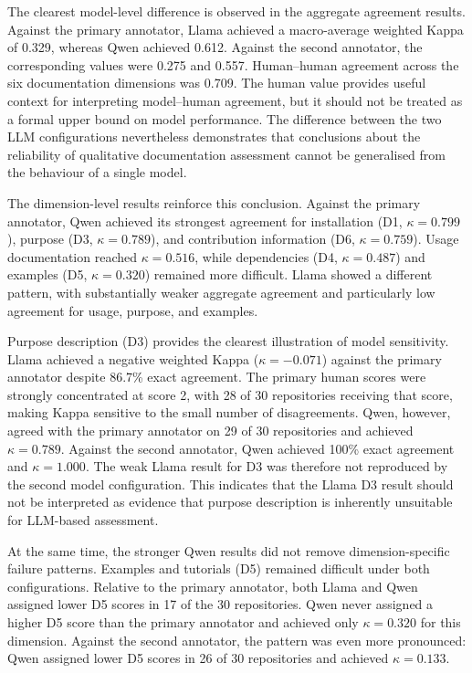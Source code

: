 The clearest model-level difference is observed in the aggregate
agreement results. Against the primary annotator, Llama achieved a
macro-average weighted Kappa of 0.329, whereas Qwen achieved 0.612.
Against the second annotator, the corresponding values were 0.275
and 0.557. Human--human agreement across the six documentation
dimensions was 0.709. The human value provides useful context for
interpreting model--human agreement, but it should not be treated as
a formal upper bound on model performance. The difference between
the two LLM configurations nevertheless demonstrates that conclusions
about the reliability of qualitative documentation assessment cannot
be generalised from the behaviour of a single model.

The dimension-level results reinforce this conclusion. Against the
primary annotator, Qwen achieved its strongest agreement for
installation (D1, $\kappa=0.799$), purpose
(D3, $\kappa=0.789$), and contribution information
(D6, $\kappa=0.759$). Usage documentation reached
$\kappa=0.516$, while dependencies (D4, $\kappa=0.487$) and examples
(D5, $\kappa=0.320$) remained more difficult. Llama showed a
different pattern, with substantially weaker aggregate agreement and
particularly low agreement for usage, purpose, and examples.

Purpose description (D3) provides the clearest illustration of model
sensitivity. Llama achieved a negative weighted Kappa
($\kappa=-0.071$) against the primary annotator despite 86.7\% exact
agreement. The primary human scores were strongly concentrated at
score 2, with 28 of 30 repositories receiving that score, making
Kappa sensitive to the small number of disagreements. Qwen, however,
agreed with the primary annotator on 29 of 30 repositories and
achieved $\kappa=0.789$. Against the second annotator, Qwen achieved
100\% exact agreement and $\kappa=1.000$. The weak Llama result for
D3 was therefore not reproduced by the second model configuration.
This indicates that the Llama D3 result should not be interpreted as
evidence that purpose description is inherently unsuitable for
LLM-based assessment.

At the same time, the stronger Qwen results did not remove
dimension-specific failure patterns. Examples and tutorials (D5)
remained difficult under both configurations. Relative to the primary
annotator, both Llama and Qwen assigned lower D5 scores in 17 of the
30 repositories. Qwen never assigned a higher D5 score than the
primary annotator and achieved only $\kappa=0.320$ for this dimension.
Against the second annotator, the pattern was even more pronounced:
Qwen assigned lower D5 scores in 26 of 30 repositories and achieved
$\kappa=0.133$.

